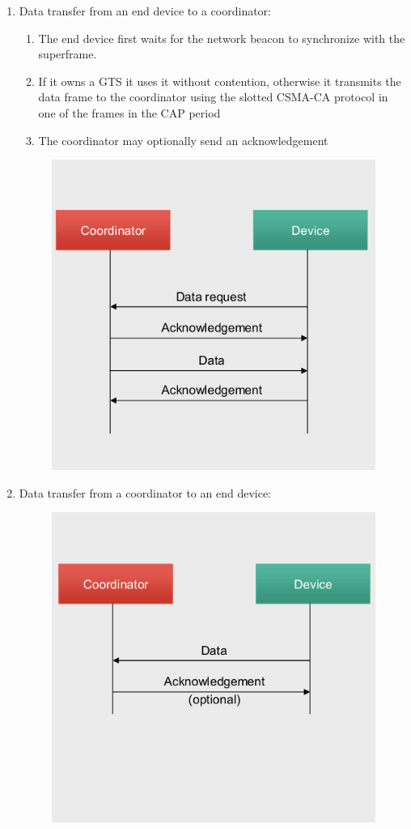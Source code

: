 \begin{enumerate}
   \item Data transfer from an end device to a coordinator:
   \begin{paracol}{2}
      
      \begin{enumerate}
         \item The end device first waits for the network beacon to synchronize with the superframe.
         \item If it owns a GTS it uses it without contention, otherwise it transmits the data frame to the coordinator using the slotted CSMA-CA protocol in one of the frames in the CAP period
         \item The coordinator may optionally send an acknowledgement
      \end{enumerate}

      \switchcolumn

      \begin{figure}[htbp]
         \centering
         \includegraphics[width=0.3\columnwidth]{images/802_datatransfer_1.png}
         \label{fig:802_datatransfer_1}
      \end{figure}
   \end{paracol}
      \item Data transfer from a coordinator to an end device:
   \begin{figure}[htbp]
      \centering
      \includegraphics[width=0.3\columnwidth]{images/802_datatransfer_2.png}
      \label{fig:802_datatransfer_2}
   \end{figure}


\end{enumerate}
